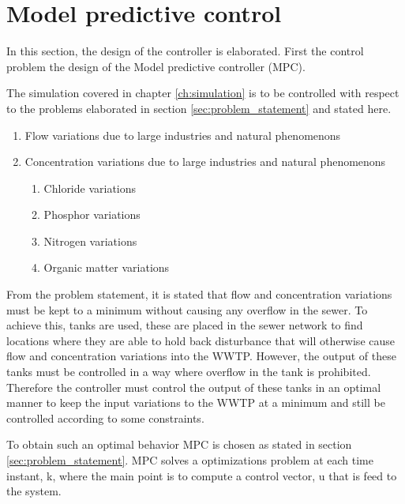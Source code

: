 \section{Model predictive control}\label{se:model_predictive_control}
In this section, the design of the controller is elaborated. First the control problem the design of the Model predictive controller (MPC). 

The simulation covered in chapter \ref{ch:simulation} is to be controlled with respect to the problems elaborated in section \ref{sec:problem_statement} and stated here. 
\begin{enumerate}
\item Flow variations due to large industries and natural phenomenons
\item Concentration variations due to large industries and natural phenomenons
\begin{enumerate}
	\item Chloride variations
	\item Phosphor variations
	\item Nitrogen variations
	\item Organic matter variations
\end{enumerate}
\end{enumerate}

From the problem statement, it is stated that flow and concentration variations must be kept to a minimum without causing any overflow in the sewer. To achieve this, tanks are used, these are placed in the sewer network to find locations where they are able to hold back disturbance that will otherwise cause flow and concentration variations into the WWTP. However, the output of these tanks must be controlled in a way where overflow in the tank is prohibited. Therefore the controller must control the output of these tanks in an optimal manner to keep the input variations to the WWTP at a minimum and still be controlled according to some constraints.

To obtain such an optimal behavior MPC is chosen as stated in section \ref{sec:problem_statement}. MPC solves a optimizations problem at each time instant, k, where the main point is to compute a control vector, u that is feed to the system. 

